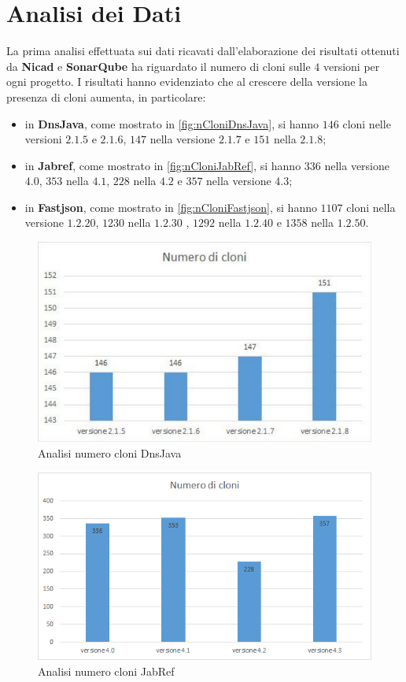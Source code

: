 \section{Analisi dei Dati}
La prima analisi effettuata sui dati ricavati dall'elaborazione dei risultati ottenuti da \textbf{Nicad} e \textbf{SonarQube} ha riguardato il numero di cloni sulle $4$ versioni per ogni progetto. I risultati hanno evidenziato che al crescere della versione la presenza di cloni aumenta, in particolare:
\begin{itemize}
	\item in \textbf{DnsJava}, come mostrato in \autoref{fig:nCloniDnsJava}, si hanno $146$ cloni nelle versioni $2.1.5$ e $2.1.6$, $147$ nella versione $2.1.7$ e $151$ nella $2.1.8$;
	\item in \textbf{Jabref}, come mostrato in \autoref{fig:nCloniJabRef}, si hanno $336$ nella versione $4.0$, $353$ nella $4.1$, $228$ nella $4.2$ e $357$ nella versione $4.3$;
	\item in \textbf{Fastjson}, come mostrato in \autoref{fig:nCloniFastjson}, si hanno $1107$ cloni nella versione $1.2.20$, $1230$ nella $1.2.30$ , $1292$ nella $1.2.40$ e $1358$ nella $1.2.50$.
\end{itemize}
\begin{figure}[h]
	\centering
	\includegraphics[scale=0.7, trim = 0cm 0cm 0cm 0cm, clip=true]{Grafici_dnsJava/NumeroCloni.pdf}
	\caption{Analisi numero cloni DnsJava}
	\label{fig:nCloniDnsJava}
\end{figure}
\begin{figure}[h]
	\centering
	\includegraphics[scale=0.58, trim = 0cm 0cm 0cm 0cm, clip=true]{Grafici_jabRef/NumeroCloni.png}
	\caption{Analisi numero cloni JabRef}
	\label{fig:nCloniJabRef}
\end{figure}
